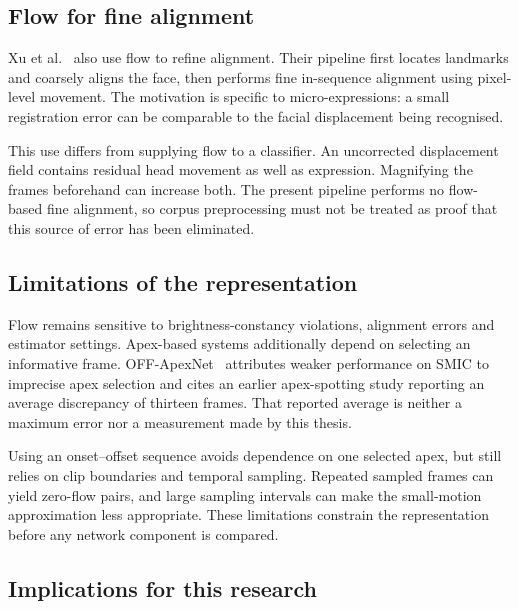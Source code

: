 \subsection{Flow for fine alignment}
\label{sec:flow-alignment}

Xu et al.~\cite{xu2017} also use flow to refine alignment. Their pipeline first locates landmarks and coarsely aligns the face, then performs fine in-sequence alignment using pixel-level movement. The motivation is specific to micro-expressions: a small registration error can be comparable to the facial displacement being recognised.

This use differs from supplying flow to a classifier. An uncorrected displacement field contains residual head movement as well as expression. Magnifying the frames beforehand can increase both. The present pipeline performs no flow-based fine alignment, so corpus preprocessing must not be treated as proof that this source of error has been eliminated.

\subsection{Limitations of the representation}
\label{sec:flow-limitations}

Flow remains sensitive to brightness-constancy violations, alignment errors and estimator settings. Apex-based systems additionally depend on selecting an informative frame. OFF-ApexNet~\cite{liong2019a} attributes weaker performance on SMIC to imprecise apex selection and cites an earlier apex-spotting study reporting an average discrepancy of thirteen frames. That reported average is neither a maximum error nor a measurement made by this thesis.

Using an onset--offset sequence avoids dependence on one selected apex, but still relies on clip boundaries and temporal sampling. Repeated sampled frames can yield zero-flow pairs, and large sampling intervals can make the small-motion approximation less appropriate. These limitations constrain the representation before any network component is compared.

\subsection{Implications for this research}
\label{sec:flow-implications}


